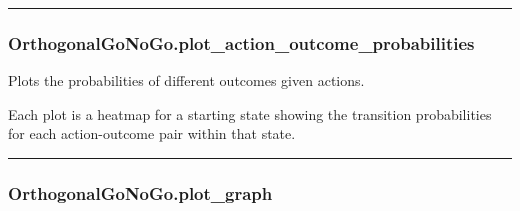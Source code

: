\begin{Shaded}
\begin{Highlighting}[]
\OperatorTok{=}
\end{Highlighting}
\end{Shaded}

\begin{center}\rule{0.5\linewidth}{\linethickness}\end{center}

\subsubsection{OrthogonalGoNoGo.plot\_action\_outcome\_probabilities}\label{orthogonalgonogo.plot_action_outcome_probabilities}

\begin{Shaded}
\begin{Highlighting}[]
\OperatorTok{=}\OperatorTok{=}\OperatorTok{=}\OperatorTok{=}\NormalTok{)}
\end{Highlighting}
\end{Shaded}

Plots the probabilities of different outcomes given actions.

Each plot is a heatmap for a starting state showing the transition
probabilities for each action-outcome pair within that state.

\begin{center}\rule{0.5\linewidth}{\linethickness}\end{center}

\subsubsection{OrthogonalGoNoGo.plot\_graph}\label{orthogonalgonogo.plot_graph}

\begin{Shaded}
\begin{Highlighting}[]
\OperatorTok{=}\OperatorTok{=}\OperatorTok{=}\OperatorTok{=}\OperatorTok{=}\OperatorTok{=}\OperatorTok{=}\OperatorTok{=}\NormalTok{)}
\end{Highlighting}
\end{Shaded}

